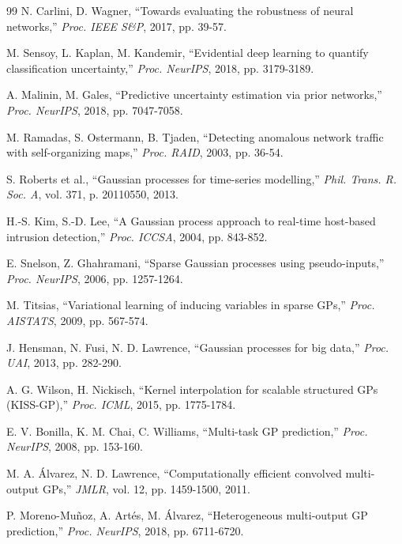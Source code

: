 \documentclass[review,12pt]{elsarticle}
\begin{document}
\begin{thebibliography}{99}
N. Carlini, D. Wagner, ``Towards evaluating the robustness of neural networks,'' \textit{Proc. IEEE S\&P}, 2017, pp. 39-57.

M. Sensoy, L. Kaplan, M. Kandemir, ``Evidential deep learning to quantify classification uncertainty,'' \textit{Proc. NeurIPS}, 2018, pp. 3179-3189.

A. Malinin, M. Gales, ``Predictive uncertainty estimation via prior networks,'' \textit{Proc. NeurIPS}, 2018, pp. 7047-7058.

M. Ramadas, S. Ostermann, B. Tjaden, ``Detecting anomalous network traffic with self-organizing maps,'' \textit{Proc. RAID}, 2003, pp. 36-54.

S. Roberts et al., ``Gaussian processes for time-series modelling,'' \textit{Phil. Trans. R. Soc. A}, vol. 371, p. 20110550, 2013.

H.-S. Kim, S.-D. Lee, ``A Gaussian process approach to real-time host-based intrusion detection,'' \textit{Proc. ICCSA}, 2004, pp. 843-852.

E. Snelson, Z. Ghahramani, ``Sparse Gaussian processes using pseudo-inputs,'' \textit{Proc. NeurIPS}, 2006, pp. 1257-1264.

M. Titsias, ``Variational learning of inducing variables in sparse GPs,'' \textit{Proc. AISTATS}, 2009, pp. 567-574.

J. Hensman, N. Fusi, N. D. Lawrence, ``Gaussian processes for big data,'' \textit{Proc. UAI}, 2013, pp. 282-290.

A. G. Wilson, H. Nickisch, ``Kernel interpolation for scalable structured GPs (KISS-GP),'' \textit{Proc. ICML}, 2015, pp. 1775-1784.

E. V. Bonilla, K. M. Chai, C. Williams, ``Multi-task GP prediction,'' \textit{Proc. NeurIPS}, 2008, pp. 153-160.

M. A. Álvarez, N. D. Lawrence, ``Computationally efficient convolved multi-output GPs,'' \textit{JMLR}, vol. 12, pp. 1459-1500, 2011.

P. Moreno-Muñoz, A. Artés, M. Álvarez, ``Heterogeneous multi-output GP prediction,'' \textit{Proc. NeurIPS}, 2018, pp. 6711-6720.


\end{thebibliography}
\end{document}
